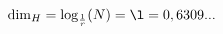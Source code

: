 \documentclass[preview]{standalone}
\begin{document}
\begin{align*}
\operatorname{dim}_{H} = \log_{\frac{1}{r}}(N)=\l=0,6309...
\end{align*}
\end{document}
